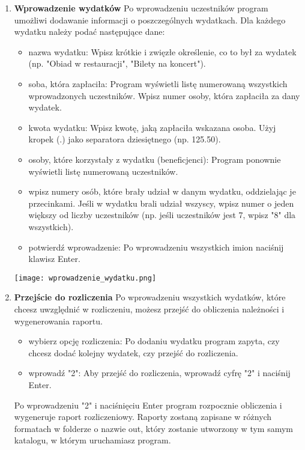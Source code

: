 \documentclass{article}
\begin{document}
\begin{enumerate}
\item \textbf{Wprowadzenie wydatków}
Po wprowadzeniu uczestników program umożliwi dodawanie informacji o poszczególnych wydatkach. Dla każdego wydatku należy podać następujące dane:
\begin{itemize}
\item nazwa wydatku: Wpisz krótkie i zwięzłe określenie, co to był za wydatek (np. "Obiad w restauracji", "Bilety na koncert").
\item soba, która zapłaciła: Program wyświetli listę numerowaną wszystkich wprowadzonych uczestników. Wpisz numer osoby, która zapłaciła za dany wydatek.
\item kwota wydatku: Wpisz kwotę, jaką zapłaciła wskazana osoba. Użyj kropek (.) jako separatora dziesiętnego (np. 125.50).
\item osoby, które korzystały z wydatku (beneficjenci): Program ponownie wyświetli listę numerowaną uczestników. \item wpisz numery osób, które brały udział w danym wydatku, oddzielając je przecinkami. Jeśli w wydatku brali udział wszyscy, wpisz numer o jeden większy od liczby uczestników (np. jeśli uczestników jest 7, wpisz "8" dla wszystkich).
	\item potwierdź wprowadzenie: Po wprowadzeniu wszystkich imion naciśnij klawisz Enter.
\end{itemize}
\begin{center}
	\texttt{[image: wprowadzenie\_wydatku.png]}
\end{center}

\item \textbf{Przejście do rozliczenia}
Po wprowadzeniu wszystkich wydatków, które chcesz uwzględnić w rozliczeniu, możesz przejść do obliczenia należności i wygenerowania raportu.
\begin{itemize}
	\item wybierz opcję rozliczenia: Po dodaniu wydatku program zapyta, czy chcesz dodać kolejny wydatek, czy przejść do rozliczenia.
	\item wprowadź "2": Aby przejść do rozliczenia, wprowadź cyfrę "2" i naciśnij Enter.
\end{itemize}
Po wprowadzeniu "2" i naciśnięciu Enter program rozpocznie obliczenia i wygeneruje raport rozliczeniowy. Raporty zostaną zapisane w różnych formatach w folderze o nazwie out, który zostanie utworzony w tym samym katalogu, w którym uruchamiasz program. 

\end{enumerate}
\end{document}
